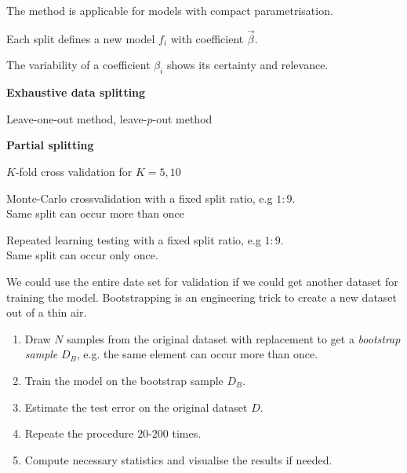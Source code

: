 \documentclass[landscape,footrule]{foils}
\begin{document}
\vspace*{-.5cm}
\begin{triangles}
\item The method is applicable for models with compact parametrisation.
\item Each split defines a new model $f_i$ with coefficient $\vec{\beta}$.   
\item The variability of a coefficient $\beta_i$ shows its certainty and relevance. 
\end{triangles}



\textbf{Exhaustive data splitting}
\begin{triangles}
\item Leave-one-out method, leave-$p$-out method
\end{triangles}
\vspace*{1cm}

\textbf{Partial splitting}
\begin{triangles}
\item $K$-fold cross validation for $K = 5 , 10$ 
\item Monte-Carlo crossvalidation with a fixed split ratio, e.g $1:9$.\\ Same split can occur more than once  
\item Repeated learning testing with  a fixed split ratio, e.g $1:9$.
\\ Same split can occur only once. 
\end{triangles}



We could use the entire date set for validation if we could get another dataset for training the model. Bootstrapping is an engineering trick to create a new dataset out of a thin air.
\begin{enumerate}
\item Draw $N$ samples from the original dataset with replacement to get a \emph{bootstrap sample} $D_{B}$, e.g. the same element can occur more than once.
\item Train the model  on the bootstrap sample $D_B$.
\item Estimate the test error on the original dataset $D$.
\item Repeate the procedure $20$-$200$ times.
\item Compute necessary statistics and visualise the results if needed.
\end{enumerate}
\end{document}
